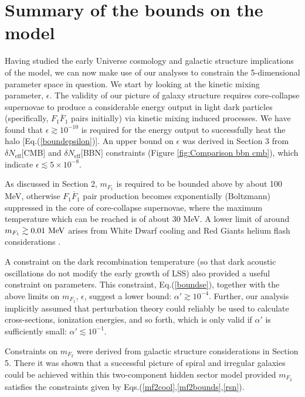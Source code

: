 \documentclass[12pt]{article}
\begin{document}
{{\vskip 1.5cm

\section{Summary of the bounds on the model}

\vskip 0.7cm

Having studied the early Universe cosmology and galactic structure implications of the model, we can now make use of our analyses to constrain the 5-dimensional parameter space in question. We start by looking at the kinetic mixing parameter, $\epsilon$. The validity of our picture of galaxy structure requires core-collapse supernovae to produce a considerable energy output in light dark particles (specifically, $F_1\overline{F}_1$ pairs initially) via kinetic mixing induced processes. We have found that $\epsilon \gtrsim 10 ^{-10}$ is required for the energy output to successfully heat the halo [Eq.(\ref{boundepsilon})]. An upper bound on $\epsilon$ was derived in Section 3 from $\delta N _{\text{eff}}$[CMB] and $\delta N _{\text{eff}}$[BBN] constraints (Figure \ref{fig:Comparison bbn cmb}), which indicate $\epsilon \lesssim 5 \times 10 ^{-8}$.

As discussed in Section 2, $m _{F_1}$ is required to be bounded above by about 100 MeV, otherwise $F _1\overline{F} _1$ pair production becomes exponentially (Boltzmann) suppressed in the core of core-collapse supernovae, where the maximum temperature which can be reached is of about 30 MeV. A lower limit of around $m _{F_1} \gtrsim 0.01 \ \rm MeV$ arises from White Dwarf cooling  and Red Giants helium flash considerations \cite{updated}.

A constraint on the dark recombination temperature (so that dark acoustic oscillations do not modify the early growth of LSS) also provided a useful constraint on parameters. This constraint, Eq.(\ref{boundse}), together with the above limits on $m _{F_1}$, $\epsilon$, suggest a lower bound: $\alpha ' \gtrsim 10 ^{-4}$. Further, our analysis implicitly assumed that perturbation theory could reliably be used to calculate cross-sections, ionization energies, and so forth, which is only valid if $\alpha '$ is sufficiently small: $\alpha ' \lesssim 10 ^{-1}$.

Constraints on $m _{F_2}$ were derived from galactic structure considerations in Section 5. There it was shown that a successful picture of spiral and irregular galaxies could be achieved within this two-component hidden sector model provided $m _{F_2}$ satisfies the constraints given by Eqs.(\ref{mf2cool},\ref{mf2bounds},\ref{rsn}).

}}
\end{document}

